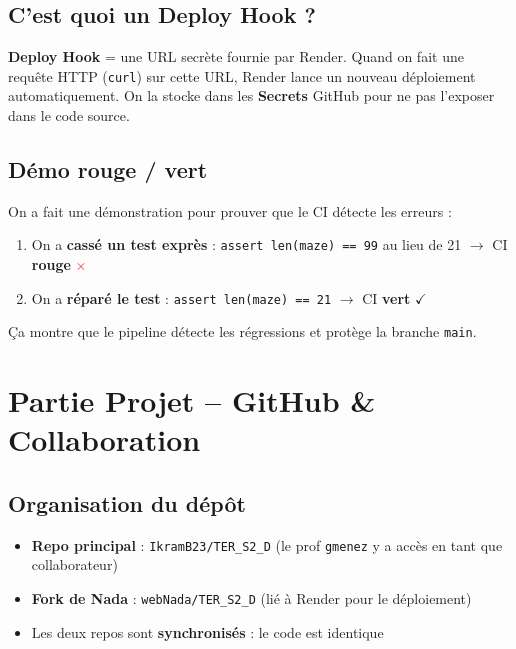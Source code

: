 \documentclass[12pt,a4paper]{article}
\begin{document}
\subsection{C'est quoi un Deploy Hook ?}

\begin{definitionbox}
\textbf{Deploy Hook} = une URL secrète fournie par Render. Quand on fait une requête HTTP (\texttt{curl}) sur cette URL, Render lance un nouveau déploiement automatiquement. On la stocke dans les \textbf{Secrets} GitHub pour ne pas l'exposer dans le code source.
\end{definitionbox}

\subsection{Démo rouge / vert}

On a fait une démonstration pour prouver que le CI détecte les erreurs :
\begin{enumerate}
    \item On a \textbf{cassé un test exprès} : \texttt{assert len(maze) == 99} au lieu de 21 $\rightarrow$ CI \textbf{rouge} \textcolor{red}{$\boldsymbol{\times}$}
    \item On a \textbf{réparé le test} : \texttt{assert len(maze) == 21} $\rightarrow$ CI \textbf{vert} \textcolor{green!60!black}{$\boldsymbol{\checkmark}$}
\end{enumerate}

Ça montre que le pipeline détecte les régressions et protège la branche \texttt{main}.

\section{Partie Projet -- GitHub \& Collaboration}

\subsection{Organisation du dépôt}

\begin{itemize}
    \item \textbf{Repo principal} : \texttt{IkramB23/TER\_S2\_D} (le prof \texttt{gmenez} y a accès en tant que collaborateur)
    \item \textbf{Fork de Nada} : \texttt{webNada/TER\_S2\_D} (lié à Render pour le déploiement)
    \item Les deux repos sont \textbf{synchronisés} : le code est identique
\end{itemize}
\end{document}
